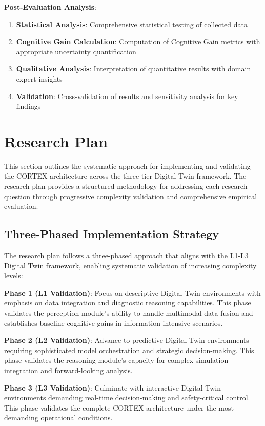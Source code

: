\textbf{Post-Evaluation Analysis}:

\begin{enumerate}
\item \textbf{Statistical Analysis}: Comprehensive statistical testing of collected data
\item \textbf{Cognitive Gain Calculation}: Computation of Cognitive Gain metrics with appropriate uncertainty quantification
\item \textbf{Qualitative Analysis}: Interpretation of quantitative results with domain expert insights
\item \textbf{Validation}: Cross-validation of results and sensitivity analysis for key findings
\end{enumerate}

\section{Research Plan}

This section outlines the systematic approach for implementing and validating the CORTEX architecture across the three-tier Digital Twin framework. The research plan provides a structured methodology for addressing each research question through progressive complexity validation and comprehensive empirical evaluation.

\subsection{Three-Phased Implementation Strategy}

The research plan follows a three-phased approach that aligns with the L1-L3 Digital Twin framework, enabling systematic validation of increasing complexity levels:

\textbf{Phase 1 (L1 Validation)}: Focus on descriptive Digital Twin environments with emphasis on data integration and diagnostic reasoning capabilities. This phase validates the perception module's ability to handle multimodal data fusion and establishes baseline cognitive gains in information-intensive scenarios.

\textbf{Phase 2 (L2 Validation)}: Advance to predictive Digital Twin environments requiring sophisticated model orchestration and strategic decision-making. This phase validates the reasoning module's capacity for complex simulation integration and forward-looking analysis.

\textbf{Phase 3 (L3 Validation)}: Culminate with interactive Digital Twin environments demanding real-time decision-making and safety-critical control. This phase validates the complete CORTEX architecture under the most demanding operational conditions.

